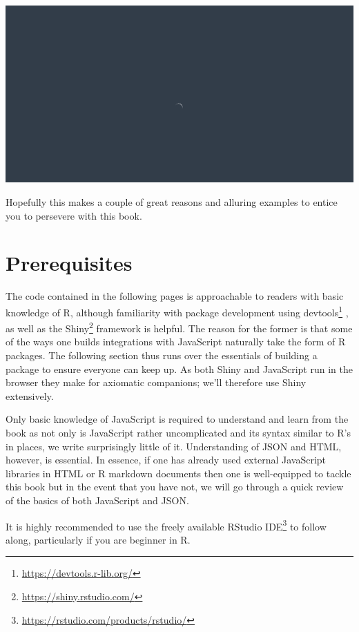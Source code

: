 \documentclass[
]{krantz}
\renewcommand{\href}[2]{#2\footnote{\url{#1}}}
\begin{document}
\begin{flushleft}\includegraphics[width=6.25in]{images/waiter} \end{flushleft}

Hopefully this makes a couple of great reasons and alluring examples to entice you to persevere with this book.

\hypertarget{prerequisites}{%
\section*{Prerequisites}\label{prerequisites}}


The code contained in the following pages is approachable to readers with basic knowledge of R, although familiarity with package development using \href{https://devtools.r-lib.org/}{devtools} \citep{R-devtools}, as well as the \href{https://shiny.rstudio.com/}{Shiny} \citep{R-shiny} framework is helpful. The reason for the former is that some of the ways one builds integrations with JavaScript naturally take the form of R packages. The following section thus runs over the essentials of building a package to ensure everyone can keep up. As both Shiny and JavaScript run in the browser they make for axiomatic companions; we'll therefore use Shiny extensively.

Only basic knowledge of JavaScript is required to understand and learn from the book as not only is JavaScript rather uncomplicated and its syntax similar to R's in places, we write surprisingly little of it. Understanding of JSON and HTML, however, is essential. In essence, if one has already used external JavaScript libraries in HTML or R markdown documents then one is well-equipped to tackle this book but in the event that you have not, we will go through a quick review of the basics of both JavaScript and JSON.

It is highly recommended to use the freely available \href{https://rstudio.com/products/rstudio/}{RStudio IDE} to follow along, particularly if you are beginner in R.
\end{document}
